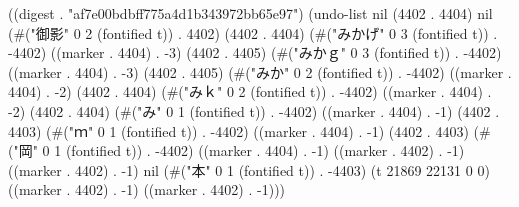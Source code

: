
((digest . "af7e00bdbff775a4d1b343972bb65e97") (undo-list nil (4402 . 4404) nil (#("御影" 0 2 (fontified t)) . 4402) (4402 . 4404) (#("みかげ" 0 3 (fontified t)) . -4402) ((marker . 4404) . -3) (4402 . 4405) (#("みかｇ" 0 3 (fontified t)) . -4402) ((marker . 4404) . -3) (4402 . 4405) (#("みか" 0 2 (fontified t)) . -4402) ((marker . 4404) . -2) (4402 . 4404) (#("みｋ" 0 2 (fontified t)) . -4402) ((marker . 4404) . -2) (4402 . 4404) (#("み" 0 1 (fontified t)) . -4402) ((marker . 4404) . -1) (4402 . 4403) (#("ｍ" 0 1 (fontified t)) . -4402) ((marker . 4404) . -1) (4402 . 4403) (#("岡" 0 1 (fontified t)) . -4402) ((marker . 4404) . -1) ((marker . 4402) . -1) ((marker . 4402) . -1) nil (#("本" 0 1 (fontified t)) . -4403) (t 21869 22131 0 0) ((marker . 4402) . -1) ((marker . 4402) . -1)))
